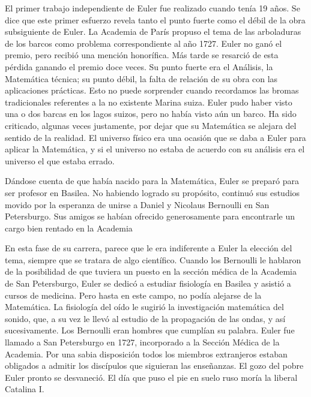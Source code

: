 \documentclass[a4paper, 12pt]{article}
\begin{document}
El primer trabajo independiente de Euler fue realizado cuando tenía 19 años. Se dice que este primer esfuerzo revela tanto el punto fuerte como el débil de la obra subsiguiente de Euler. La Academia de París propuso el tema de las arboladuras de los barcos como problema correspondiente al año 1727. Euler no ganó el premio, pero recibió una mención honorífica. Más tarde se resarció de esta pérdida ganando el premio doce veces. Su punto fuerte era el Análisis, la Matemática técnica; su punto débil, la falta de relación de su obra con las aplicaciones prácticas. Esto no puede sorprender cuando recordamos las bromas tradicionales referentes a la no existente Marina suiza. Euler pudo haber visto una o dos barcas en los lagos suizos, pero no había visto aún un barco. Ha sido criticado, algunas veces justamente, por dejar que su Matemática se alejara del sentido de la realidad. El universo físico era una ocasión que se daba a Euler para aplicar la Matemática, y si el universo no estaba de acuerdo con su análisis era el universo el que estaba errado.

Dándose cuenta de que había nacido para la Matemática, Euler se preparó para ser profesor en Basilea. No habiendo logrado su propósito, continuó sus estudios movido por la esperanza de unirse a Daniel y Nicolaus Bernoulli en San Petersburgo. Sus amigos se habían ofrecido generosamente para encontrarle un cargo bien rentado en la Academia

En esta fase de su carrera, parece que le era indiferente a Euler la elección del tema, siempre que se tratara de algo científico. Cuando los Bernoulli le hablaron de la posibilidad de que tuviera un puesto en la sección médica de la Academia de San Petersburgo, Euler se dedicó a estudiar fisiología en Basilea y asistió a cursos de medicina. Pero hasta en este campo, no podía alejarse de la Matemática. La fisiología del oído le sugirió la investigación matemática del sonido, que, a su vez le llevó al estudio de la propagación de las ondas, y así sucesivamente. Los Bernoulli eran hombres que cumplían su palabra. Euler fue llamado a San Petersburgo en 1727, incorporado a la Sección Médica de la Academia. Por una sabia disposición todos los miembros extranjeros estaban obligados a admitir los discípulos que siguieran las enseñanzas. El gozo del pobre Euler pronto se desvaneció. El día que puso el pie en suelo ruso moría la liberal Catalina I.
\end{document}
